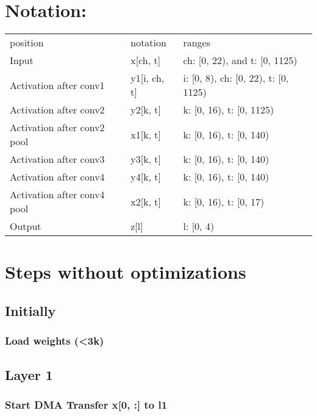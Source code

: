 \documentclass[11pt]{article}
\date{\today}
\title{}
\begin{document}
\tableofcontents

\section{Notation:}
\label{sec:org16e74e1}
\begin{center}
\begin{tabular}{lll}
position & notation & ranges\\
Input & x[ch, t] & ch: [0, 22), and t: [0, 1125)\\
Activation after conv1 & y1[i, ch, t] & i: [0, 8), ch: [0, 22), t: [0, 1125)\\
Activation after conv2 & y2[k, t] & k: [0, 16), t: [0, 1125)\\
Activation after conv2 pool & x1[k, t] & k: [0, 16), t: [0, 140)\\
Activation after conv3 & y3[k, t] & k: [0, 16), t: [0, 140)\\
Activation after conv4 & y4[k, t] & k: [0, 16), t: [0, 140)\\
Activation after conv4 pool & x2[k, t] & k: [0, 16), t: [0, 17)\\
Output & z[l] & l: [0, 4)\\
\end{tabular}
\end{center}
\section{Steps without optimizations}
\label{sec:orge526c85}
\subsection{Initially}
\label{sec:org127c1ba}
\subsubsection{Load weights (<3k)}
\label{sec:org83ae51c}
\subsection{Layer 1}
\label{sec:org72b6f0f}
\subsubsection{Start DMA Transfer x[0, :] to l1}
\label{sec:org8f8ab92}
\end{document}
